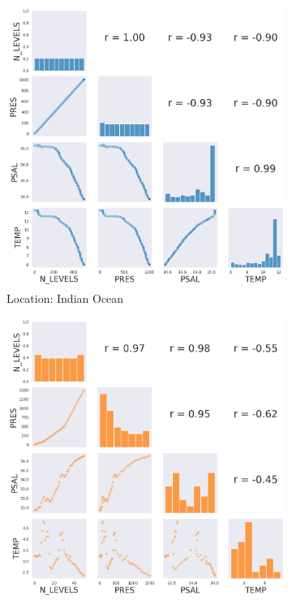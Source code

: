 \documentclass[12pt]{article}
\begin{document}
    \begin{figure}[H]
        \centering
        \begin{subfigure}{.5\textwidth}
            \centering
            \includegraphics[width=1\textwidth]{correlation1.png}
        \caption{Location: Indian Ocean}
        \end{subfigure}%
        \begin{subfigure}{.5\textwidth}
            \centering
            \includegraphics[width=1\textwidth]{correlation2.png}

\end{subfigure}
\end{figure}
\end{document}
